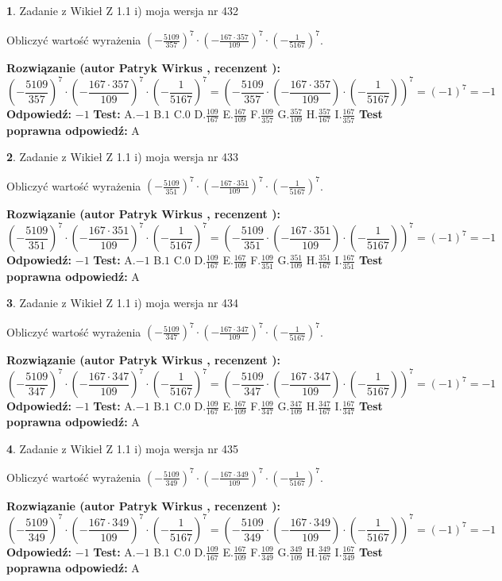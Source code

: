 \documentclass[12pt, a4paper]{article}
\theoremstyle{definition} %
\newtheorem{zad}{}
\newcommand{\zadStart}[1]{\begin{zad}#1\newline}
\newcommand{\zadStop}{\end{zad}}
\newcommand{\rozwStart}[2]{\noindent \textbf{Rozwiązanie (autor #1 , recenzent #2): }\newline}
\newcommand{\rozwStop}{\newline}
\newcommand{\odpStart}{\noindent \textbf{Odpowiedź:}\newline}
\newcommand{\odpStop}{\newline}
\newcommand{\testStart}{\noindent \textbf{Test:}\newline}
\newcommand{\testStop}{\newline}
\newcommand{\kluczStart}{\noindent \textbf{Test poprawna odpowiedź:}\newline}
\newcommand{\kluczStop}{\newline}
\begin{document}
\zadStart{Zadanie z Wikieł Z 1.1 i) moja wersja nr 432}

Obliczyć wartość wyrażenia $(-\frac{5109}{357})^{7} \cdot (-\frac{167 \cdot 357}{109})^{7} \cdot (-\frac{1}{5167})^{7}$.
\zadStop
\rozwStart{Patryk Wirkus}{}
$$(-\frac{5109}{357})^{7} \cdot (-\frac{167 \cdot 357}{109})^{7} \cdot (-\frac{1}{5167})^{7} = (-\frac{5109}{357} \cdot (-\frac{167 \cdot 357}{109}) \cdot (-\frac{1}{5167}))^{7} = (-1)^{7} = -1$$
\rozwStop
\odpStart
$-1$
\odpStop
\testStart
A.$-1$ B.$1$ C.$0$ D.$\frac{109}{167}$ E.$\frac{167}{109}$
F.$\frac{109}{357}$ G.$\frac{357}{109}$
H.$\frac{357}{167}$
I.$\frac{167}{357}$
\testStop
\kluczStart
A
\kluczStop



\zadStart{Zadanie z Wikieł Z 1.1 i) moja wersja nr 433}

Obliczyć wartość wyrażenia $(-\frac{5109}{351})^{7} \cdot (-\frac{167 \cdot 351}{109})^{7} \cdot (-\frac{1}{5167})^{7}$.
\zadStop
\rozwStart{Patryk Wirkus}{}
$$(-\frac{5109}{351})^{7} \cdot (-\frac{167 \cdot 351}{109})^{7} \cdot (-\frac{1}{5167})^{7} = (-\frac{5109}{351} \cdot (-\frac{167 \cdot 351}{109}) \cdot (-\frac{1}{5167}))^{7} = (-1)^{7} = -1$$
\rozwStop
\odpStart
$-1$
\odpStop
\testStart
A.$-1$ B.$1$ C.$0$ D.$\frac{109}{167}$ E.$\frac{167}{109}$
F.$\frac{109}{351}$ G.$\frac{351}{109}$
H.$\frac{351}{167}$
I.$\frac{167}{351}$
\testStop
\kluczStart
A
\kluczStop



\zadStart{Zadanie z Wikieł Z 1.1 i) moja wersja nr 434}

Obliczyć wartość wyrażenia $(-\frac{5109}{347})^{7} \cdot (-\frac{167 \cdot 347}{109})^{7} \cdot (-\frac{1}{5167})^{7}$.
\zadStop
\rozwStart{Patryk Wirkus}{}
$$(-\frac{5109}{347})^{7} \cdot (-\frac{167 \cdot 347}{109})^{7} \cdot (-\frac{1}{5167})^{7} = (-\frac{5109}{347} \cdot (-\frac{167 \cdot 347}{109}) \cdot (-\frac{1}{5167}))^{7} = (-1)^{7} = -1$$
\rozwStop
\odpStart
$-1$
\odpStop
\testStart
A.$-1$ B.$1$ C.$0$ D.$\frac{109}{167}$ E.$\frac{167}{109}$
F.$\frac{109}{347}$ G.$\frac{347}{109}$
H.$\frac{347}{167}$
I.$\frac{167}{347}$
\testStop
\kluczStart
A
\kluczStop



\zadStart{Zadanie z Wikieł Z 1.1 i) moja wersja nr 435}

Obliczyć wartość wyrażenia $(-\frac{5109}{349})^{7} \cdot (-\frac{167 \cdot 349}{109})^{7} \cdot (-\frac{1}{5167})^{7}$.
\zadStop
\rozwStart{Patryk Wirkus}{}
$$(-\frac{5109}{349})^{7} \cdot (-\frac{167 \cdot 349}{109})^{7} \cdot (-\frac{1}{5167})^{7} = (-\frac{5109}{349} \cdot (-\frac{167 \cdot 349}{109}) \cdot (-\frac{1}{5167}))^{7} = (-1)^{7} = -1$$
\rozwStop
\odpStart
$-1$
\odpStop
\testStart
A.$-1$ B.$1$ C.$0$ D.$\frac{109}{167}$ E.$\frac{167}{109}$
F.$\frac{109}{349}$ G.$\frac{349}{109}$
H.$\frac{349}{167}$
I.$\frac{167}{349}$
\testStop
\kluczStart
A
\kluczStop
\end{document}
